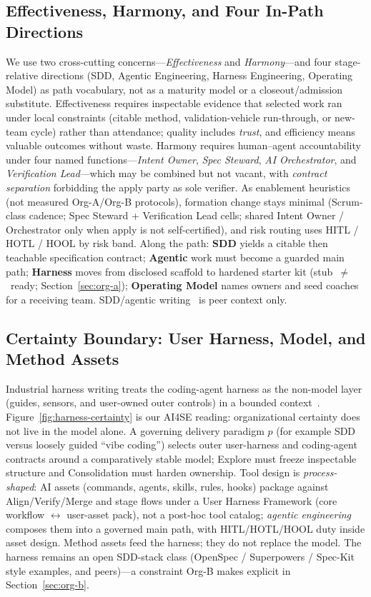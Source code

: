 \documentclass[10pt,conference]{IEEEtran}
\begin{document}
\subsection{Effectiveness, Harmony, and Four In-Path Directions}

We use two cross-cutting concerns---\emph{Effectiveness} and
\emph{Harmony}---and four stage-relative directions (SDD, Agentic Engineering,
Harness Engineering, Operating Model) as path vocabulary, not as a maturity
model or a closeout/admission substitute.
Effectiveness requires inspectable evidence that selected work ran under local
constraints (citable method, validation-vehicle run-through, or new-team cycle)
rather than attendance; quality includes \emph{trust}, and efficiency means
valuable outcomes without waste.
Harmony requires human--agent accountability under four named
functions---\emph{Intent Owner}, \emph{Spec Steward}, \emph{AI Orchestrator},
and \emph{Verification Lead}---which may be combined but not vacant, with
\emph{contract separation} forbidding the apply party as sole verifier.
As enablement heuristics (not measured Org-A/Org-B protocols)\label{sec:team-topology},
formation change stays minimal (Scrum-class cadence; Spec Steward + Verification
Lead cells; shared Intent Owner / Orchestrator only when apply is not
self-certified), and risk routing uses HITL / HOTL / HOOL by risk band.
Along the path: \textbf{SDD} yields a citable then teachable specification
contract; \textbf{Agentic} work must become a guarded main path;
\textbf{Harness} moves from disclosed scaffold to hardened starter kit
(stub~$\neq$~ready; Section~\ref{sec:org-a}); \textbf{Operating Model} names
owners and seed coaches for a receiving team.
SDD/agentic writing~\cite{Gupta2026SDDAgentic} is peer context only.

\subsection{Certainty Boundary: User Harness, Model, and Method Assets}
\label{sec:harness-boundary}

Industrial harness writing treats the coding-agent harness as the non-model
layer (guides, sensors, and user-owned outer controls) in a bounded
context~\cite{Boeckeler2026Harness}.
Figure~\ref{fig:harness-certainty} is our AI4SE reading: organizational
certainty does not live in the model alone.
A governing delivery paradigm \(p\) (for example SDD versus loosely guided
``vibe coding'') selects outer user-harness and coding-agent contracts around
a comparatively stable model; Explore must freeze inspectable structure and
Consolidation must harden ownership.
Tool design is \emph{process-shaped}: AI assets (commands, agents, skills,
rules, hooks) package against Align/Verify/Merge and stage flows under a User
Harness Framework (core workflow $\leftrightarrow$ user-asset pack), not a
post-hoc tool catalog; \emph{agentic engineering} composes them into a
governed main path, with HITL/HOTL/HOOL duty inside asset design.
Method assets feed the harness; they do not replace the model.
The harness remains an open SDD-stack class (OpenSpec / Superpowers /
Spec-Kit style examples, and peers)---a constraint Org-B makes explicit in
Section~\ref{sec:org-b}.
\end{document}

